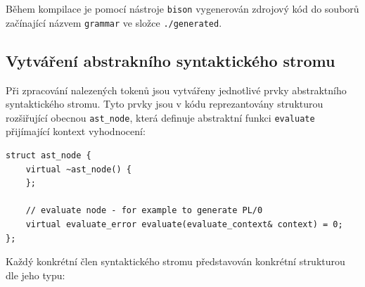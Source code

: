\documentclass[12pt, a4paper]{article}
\begin{document}
Během kompilace je pomocí nástroje \texttt{bison} vygenerován zdrojový kód do souborů začínající názvem \texttt{grammar} ve složce \texttt{./generated}.


\subsection{Vytváření abstrakního syntaktického stromu}
Při zpracování nalezených tokenů jsou vytvářeny jednotlivé prvky abstraktního syntaktického stromu. Tyto prvky jsou v kódu reprezantovány strukturou rozšiřující obecnou \texttt{ast\_node}, která definuje abstraktní funkci \texttt{evaluate} přijímající kontext vyhodnocení:

\begin{lstlisting}[caption={Struktura \texttt{ast\_node}}, captionpos=b]
struct ast_node {
    virtual ~ast_node() {
    };

    // evaluate node - for example to generate PL/0
    virtual evaluate_error evaluate(evaluate_context& context) = 0;
};
\end{lstlisting}

Každý konkrétní člen syntaktického stromu představován konkrétní strukturou dle jeho typu:
\end{document}
